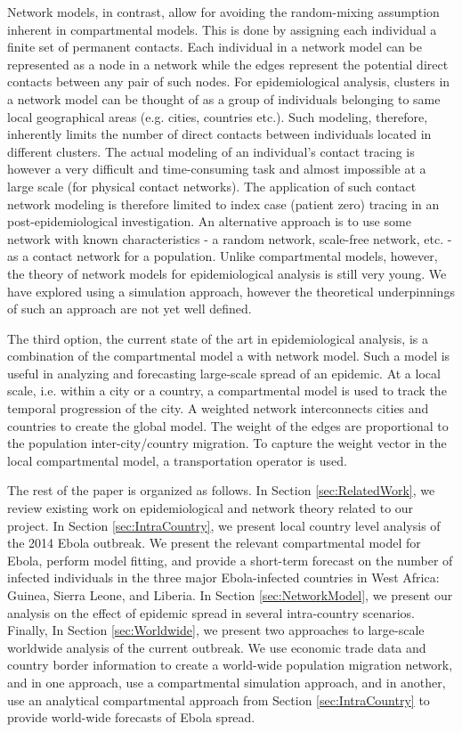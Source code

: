 \documentclass[10pt, journal,onecolumn]{IEEEtran}
\begin{document}
Network models, in contrast, allow for avoiding the random-mixing assumption inherent in compartmental
models. This is done by assigning each individual a finite set of permanent contacts. Each
individual in a network model can be represented as a node in a network while the edges represent
the potential direct contacts between any pair of such nodes. For epidemiological analysis, clusters
in a network model can be thought of as a group of individuals belonging to same local geographical
areas (e.g. cities, countries etc.). Such modeling, therefore, inherently limits the number of
direct contacts between individuals located in different clusters. The actual modeling of an
individual's contact tracing is however a very difficult and time-consuming task and almost
impossible at a large scale (for physical contact networks).
The application of such contact network modeling is therefore limited
to index case (patient zero) tracing in an post-epidemiological investigation. An alternative
approach is to use some network with known characteristics - a random network, scale-free network,
etc. - as a contact network for a population. Unlike compartmental models, however, the theory of
network models for epidemiological analysis is still very young. We have explored using a
simulation approach, however the theoretical underpinnings of such an approach are not yet well defined.

The third option, the current state of the art in epidemiological analysis, is a combination of the
compartmental model a with network model. Such a model is useful in analyzing and forecasting
large-scale spread of an epidemic. At a local scale, i.e. within a city or a country, a compartmental
model is used to track the temporal progression of the city. A weighted network interconnects
cities and countries to create the global model. The weight of the edges are proportional to the
population inter-city/country migration. To capture the weight vector in the local compartmental
model, a transportation operator is used.

The rest of the paper is organized as follows. In Section \ref{sec:RelatedWork}, we review existing
work on epidemiological and network theory related to our project. In Section
\ref{sec:IntraCountry}, we present local country level analysis of the 2014 Ebola outbreak. We
present the relevant compartmental model for Ebola, perform model fitting, and provide a short-term
forecast on the number of infected individuals in the three major Ebola-infected countries in West
Africa: Guinea, Sierra Leone, and Liberia. In Section \ref{sec:NetworkModel}, we present our
analysis on the effect of epidemic spread in several intra-country scenarios. Finally, In Section
\ref{sec:Worldwide}, we present two approaches to large-scale worldwide analysis of the current outbreak.
We use economic trade data and country border information to create a world-wide population migration
network, and in one approach, use a compartmental simulation approach, and in another, use an
analytical compartmental approach from Section \ref{sec:IntraCountry} to
provide world-wide forecasts of Ebola spread.
\end{document}
